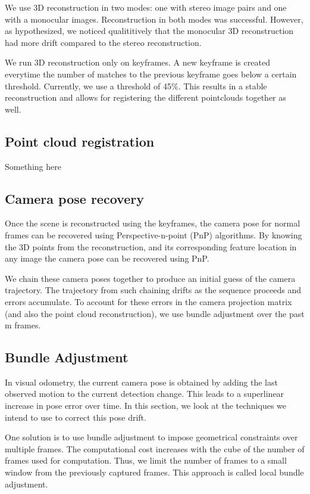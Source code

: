 \documentclass{article}
\begin{document}
We use 3D reconstruction in two modes: one with stereo image pairs and one with a monocular images. Reconstruction in both modes was successful. However, as hypothesized, we noticed qualititively that the monocular 3D reconstruction had more drift compared to the stereo reconstruction.

We run 3D reconstruction only on keyframes. A new keyframe is created everytime the number of matches to the previous keyframe goes below a certain threshold. Currently, we use a threshold of 45\%. This results in a stable reconstruction and allows for registering the different pointclouds together as well.

\subsection{Point cloud registration}
Something here\\

\subsection{Camera pose recovery}
Once the scene is reconstructed using the keyframes, the camera pose for normal frames can be recovered using Perspective-n-point (PnP) algorithms. By knowing the 3D points from the reconstruction, and its corresponding feature location in any image the camera pose can be recovered using PnP.

We chain these camera poses together to produce an initial guess of the camera trajectory. The trajectory from such chaining drifts as the sequence proceeds and errors accumulate. To account for these errors in the camera projection matrix (and also the point cloud reconstruction), we use bundle adjustment over the past m frames.

\subsection{Bundle Adjustment}
In visual odometry, the current camera pose is obtained by adding the last observed motion to the current detection change. This leads to a superlinear increase in pose error over time. In this section, we look at the techniques we intend to use to correct this pose drift.

One solution is to use bundle adjustment to impose geometrical constraints over multiple frames. The computational cost increases with the cube of the number of frames used for computation. Thus, we limit the number of frames to a small window from the previously captured frames. This approach is called local bundle adjustment.
\end{document}
